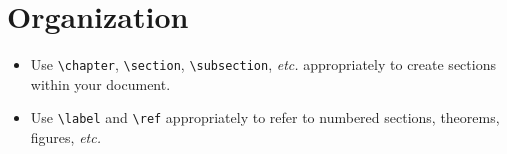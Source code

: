 \documentclass{article}
\begin{document}
\section*{Organization}

\begin{itemize}
\item Use \verb|\chapter|, \verb|\section|, \verb|\subsection|,
  \emph{etc.} appropriately to create sections within your document.
\item Use \verb|\label| and \verb|\ref| appropriately to refer to
  numbered sections, theorems, figures, \emph{etc.}
\end{itemize}
\end{document}
